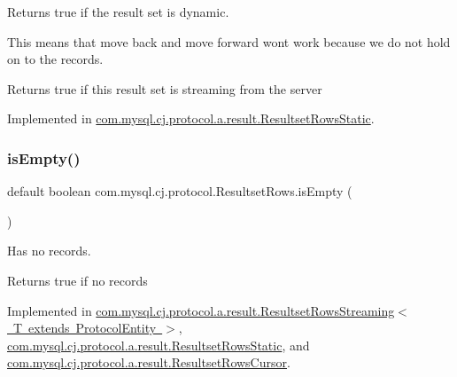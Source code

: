 Returns true if the result set is dynamic.

This means that move back and move forward won\textquotesingle{}t work because we do not hold on to the records.

\begin{DoxyReturn}{Returns}
true if this result set is streaming from the server 
\end{DoxyReturn}


Implemented in \mbox{\hyperlink{classcom_1_1mysql_1_1cj_1_1protocol_1_1a_1_1result_1_1_resultset_rows_static_acf9221e596a879c793000246688ff8f6}{com.\+mysql.\+cj.\+protocol.\+a.\+result.\+Resultset\+Rows\+Static}}.

\mbox{\label{interfacecom_1_1mysql_1_1cj_1_1protocol_1_1_resultset_rows_ae130183c4bba57a93d3fe890f14b6c25}} 
\subsubsection{\texorpdfstring{is\+Empty()}{isEmpty()}}
{\footnotesize\ttfamily default boolean com.\+mysql.\+cj.\+protocol.\+Resultset\+Rows.\+is\+Empty (\begin{DoxyParamCaption}{ }\end{DoxyParamCaption})}

Has no records.

\begin{DoxyReturn}{Returns}
true if no records 
\end{DoxyReturn}


Implemented in \mbox{\hyperlink{classcom_1_1mysql_1_1cj_1_1protocol_1_1a_1_1result_1_1_resultset_rows_streaming_a477080ab4c378e7bf32d5c1230ecedbe}{com.\+mysql.\+cj.\+protocol.\+a.\+result.\+Resultset\+Rows\+Streaming$<$ T extends Protocol\+Entity $>$}}, \mbox{\hyperlink{classcom_1_1mysql_1_1cj_1_1protocol_1_1a_1_1result_1_1_resultset_rows_static_a6e253f009ce83647195f60954d021cff}{com.\+mysql.\+cj.\+protocol.\+a.\+result.\+Resultset\+Rows\+Static}}, and \mbox{\hyperlink{classcom_1_1mysql_1_1cj_1_1protocol_1_1a_1_1result_1_1_resultset_rows_cursor_a3fcb0eaca47918a78033b083af35b02a}{com.\+mysql.\+cj.\+protocol.\+a.\+result.\+Resultset\+Rows\+Cursor}}.

